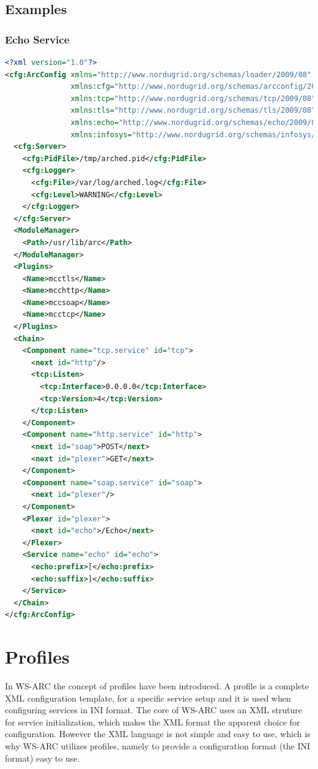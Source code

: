 \documentclass{article}
\begin{document}
\subsection{Examples}\label{sec:XML examples}
\subsubsection{Echo Service}
\begin{lstlisting}[language=xml]
<?xml version="1.0"?>
<cfg:ArcConfig xmlns="http://www.nordugrid.org/schemas/loader/2009/08"
               xmlns:cfg="http://www.nordugrid.org/schemas/arcconfig/2009/08"
               xmlns:tcp="http://www.nordugrid.org/schemas/tcp/2009/08"
               xmlns:tls="http://www.nordugrid.org/schemas/tls/2009/08"
               xmlns:echo="http://www.nordugrid.org/schemas/echo/2009/08"
               xmlns:infosys="http://www.nordugrid.org/schemas/infosys/2009/08">
  <cfg:Server>
    <cfg:PidFile>/tmp/arched.pid</cfg:PidFile>
    <cfg:Logger>
      <cfg:File>/var/log/arched.log</cfg:File>
      <cfg:Level>WARNING</cfg:Level>
    </cfg:Logger>
  </cfg:Server>
  <ModuleManager>
    <Path>/usr/lib/arc</Path>
  </ModuleManager>
  <Plugins>
    <Name>mcctls</Name>
    <Name>mcchttp</Name>
    <Name>mccsoap</Name>
    <Name>mcctcp</Name>
  </Plugins>
  <Chain>
    <Component name="tcp.service" id="tcp">
      <next id="http"/>
      <tcp:Listen>
        <tcp:Interface>0.0.0.0</tcp:Interface>
        <tcp:Version>4</tcp:Version>
      </tcp:Listen>
    </Component>
    <Component name="http.service" id="http">
      <next id="soap">POST</next>
      <next id="plexer">GET</next>
    </Component>
    <Component name="soap.service" id="soap">
      <next id="plexer"/>
    </Component>
    <Plexer id="plexer">
      <next id="echo">/Echo</next>
    </Plexer>
    <Service name="echo" id="echo">
      <echo:prefix>[</echo:prefix>
      <echo:suffix>]</echo:suffix>
    </Service>
  </Chain>
</cfg:ArcConfig>
\end{lstlisting}

\section{Profiles}\label{sec:Profiles}
In WS-ARC the concept of profiles have been introduced. A profile is a complete
XML configuration template, for a specific service setup and it is used when
configuring services in INI format. The core of WS-ARC
uses an XML struture for service initialization, which makes the XML format
the apparent choice for configuration. However the XML language is not simple
and easy to use, which is why WS-ARC utilizes profiles, namely to provide a
configuration format (the INI format) easy to use.
\end{document}
